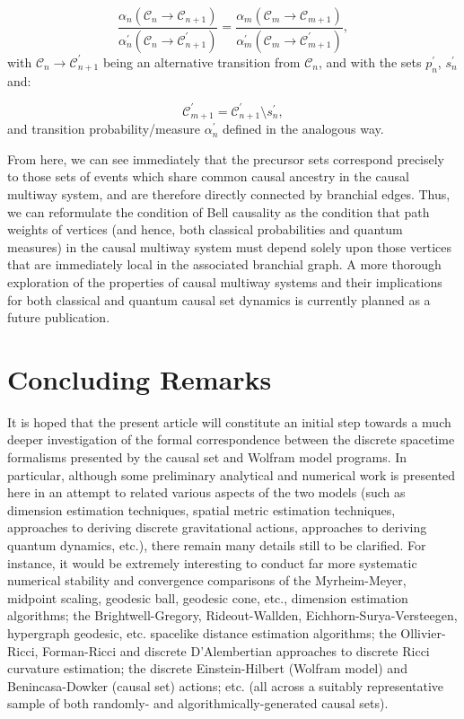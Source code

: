 \documentclass{article}
\begin{document}
\begin{equation}
\frac{\alpha_n \left( \mathcal{C}_n \to \mathcal{C}_{n + 1} \right)}{\alpha_{n}^{\prime} \left( \mathcal{C}_n \to \mathcal{C}_{n + 1}^{\prime} \right)} = \frac{\alpha_m \left( \mathcal{C}_m \to \mathcal{C}_{m + 1} \right)}{\alpha_{m}^{\prime} \left( \mathcal{C}_m \to \mathcal{C}_{m + 1}^{\prime} \right)},
\end{equation}
with ${\mathcal{C}_n \to \mathcal{C}_{n + 1}^{\prime}}$ being an alternative transition from ${\mathcal{C}_n}$, and with the sets ${p_{n}^{\prime}}$, ${s_{n}^{\prime}}$ and:

\begin{equation}
\mathcal{C}_{m + 1}^{\prime} = \mathcal{C}_{n + 1}^{\prime} \setminus s_{n}^{\prime},
\end{equation}
and transition probability/measure ${\alpha_{n}^{\prime}}$ defined in the analogous way.

From here, we can see immediately that the precursor sets correspond precisely to those sets of events which share common causal ancestry in the causal multiway system, and are therefore directly connected by branchial edges. Thus, we can reformulate the condition of Bell causality as the condition that path weights of vertices (and hence, both classical probabilities and quantum measures) in the causal multiway system must depend solely upon those vertices that are immediately local in the associated branchial graph. A more thorough exploration of the properties of causal multiway systems and their implications for both classical and quantum causal set dynamics is currently planned as a future publication.

\section{Concluding Remarks}

It is hoped that the present article will constitute an initial step towards a much deeper investigation of the formal correspondence between the discrete spacetime formalisms presented by the causal set and Wolfram model programs. In particular, although some preliminary analytical and numerical work is presented here in an attempt to related various aspects of the two models (such as dimension estimation techniques, spatial metric estimation techniques, approaches to deriving discrete gravitational actions, approaches to deriving quantum dynamics, etc.), there remain many details still to be clarified. For instance, it would be extremely interesting to conduct far more systematic numerical stability and convergence comparisons of the Myrheim-Meyer, midpoint scaling, geodesic ball, geodesic cone, etc., dimension estimation algorithms; the Brightwell-Gregory, Rideout-Wallden, Eichhorn-Surya-Versteegen, hypergraph geodesic, etc. spacelike distance estimation algorithms; the Ollivier-Ricci, Forman-Ricci and discrete D'Alembertian approaches to discrete Ricci curvature estimation; the discrete Einstein-Hilbert (Wolfram model) and Benincasa-Dowker (causal set) actions; etc. (all across a suitably representative sample of both randomly- and algorithmically-generated causal sets).
\end{document}
